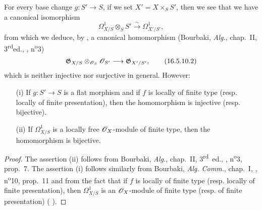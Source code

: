 \begin{env}[16.5.10]
\label{IV.16.5.10}
For every base change $g : S' \to S$, if  we set $X' = X \times_S S'$, then we see  that we have a canonical isomorphism
\[
\label{IV.16.5.10.1}
  \Omega_{X/S}^1 \otimes_S S' \xrightarrow{\sim} \Omega_{X'/S'}^1,
  \tag{16.5.10.1}
\]
from which we deduce, by , a canonical homomorphism (Bourbaki, \emph{Alg.}, chap.~II, 3\textsuperscript{rd}ed., , n\textsuperscript{o}3)
\[
\label{IV.16.5.10.2}
  \mathfrak{G}_{X/S} \otimes_{\sh{O}_S} \sh{O}_{S'} \to \mathfrak{G}_{X'/S'},
  \tag{16.5.10.2}
\]
which is neither injective nor surjective in general.
However:
\end{env}

\begin{proposition}[16.5.11]
\label{IV.16.5.11}
\begin{enumerate}
  \item[{\rm(i)}] If $g : S' \to S$ is a flat morphism and if $f$ is locally of finite type (resp. locally of finite presentation), then the homomorphism  is injective (resp. bijective).
  \item[{\rm(ii)}] If $\Omega_{X/S}^1$ is a locally free $\mathscr{O}_X$-module of finite type, then the homomorphism  is bijective.
\end{enumerate}
\end{proposition}

\begin{proof}
The assertion (ii) follows from Bourbaki, \emph{Alg.}, chap.~II, 3\textsuperscript{rd}~ed., , n\textsuperscript{o}3, prop.~7.
The assertion (i) follows similarly from Bourbaki, \emph{Alg. Comm.}, chap.~I, , n\textsuperscript{o}10, prop.~11 and from the fact that if $f$ is locally of finite type (resp. locally of finite presentation), then $\Omega_{X/S}^1$ is an $\mathscr{O}_X$-module of finite type (resp. of finite presentation) ( ).
\end{proof}

